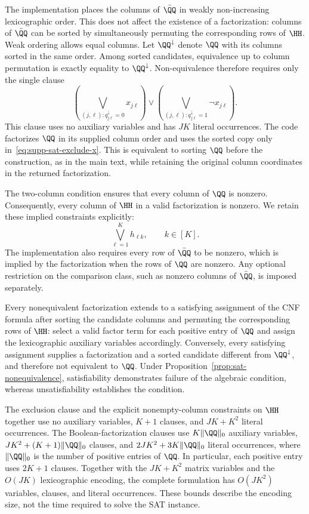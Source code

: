 The implementation places the columns of $\bar{\QQ}$ in weakly
non-increasing lexicographic order. This does not affect the existence
of a factorization: columns of $\bar{\QQ}$ can be sorted by simultaneously
permuting the corresponding rows of $\HH$. Weak ordering allows equal
columns. Let $\QQ^\downarrow$ denote $\QQ$ with its columns sorted in the
same order. Among sorted candidates, equivalence up to column permutation
is exactly equality to $\QQ^\downarrow$. Non-equivalence therefore requires
only the single clause
\begin{equation}\label{eq:supp-sat-exclude-x}
\left(\bigvee_{(j,\ell):q^\downarrow_{j\ell}=0}x_{j\ell}\right)
\vee
\left(\bigvee_{(j,\ell):q^\downarrow_{j\ell}=1}\neg x_{j\ell}\right).
\end{equation}
This clause uses no auxiliary variables and has $JK$ literal occurrences.
The code factorizes $\QQ$ in its supplied column order and uses the sorted
copy only in~\eqref{eq:supp-sat-exclude-x}. This is equivalent to sorting
$\QQ$ before the construction, as in the main text, while retaining the
original column coordinates in the returned factorization.

The two-column condition ensures that every column of $\QQ$ is nonzero.
Consequently, every column of $\HH$ in a valid factorization is nonzero.
We retain these implied constraints explicitly:
\begin{equation}\label{eq:supp-sat-h-nonempty}
\bigvee_{\ell=1}^K h_{\ell k},\qquad k\in[K].
\end{equation}
The implementation also requires every row of $\bar{\QQ}$ to be nonzero,
which is implied by the factorization when the rows of $\QQ$ are nonzero.
Any optional restriction on the comparison class, such as nonzero columns
of $\bar{\QQ}$, is imposed separately.

Every nonequivalent factorization extends to a satisfying assignment of
the CNF formula after sorting the candidate columns and permuting the
corresponding rows of $\HH$: select a valid factor term for each positive
entry of $\QQ$ and assign the lexicographic auxiliary variables accordingly.
Conversely, every satisfying assignment supplies a factorization and a
sorted candidate different from $\QQ^\downarrow$, and therefore not
equivalent to $\QQ$. Under Proposition~\ref{prop:sat-nonequivalence},
satisfiability demonstrates failure of the algebraic condition, whereas
unsatisfiability establishes the condition.

The exclusion clause and the explicit nonempty-column constraints on
$\HH$ together use no auxiliary variables, $K+1$ clauses, and $JK+K^2$
literal occurrences. The Boolean-factorization clauses use
$K\|\QQ\|_0$ auxiliary variables, $JK^2+(K+1)\|\QQ\|_0$ clauses, and
$2JK^2+3K\|\QQ\|_0$ literal occurrences, where $\|\QQ\|_0$ is the
number of positive entries of $\QQ$. In particular, each positive entry
uses $2K+1$ clauses. Together with the $JK+K^2$ matrix variables and the
$O(JK)$ lexicographic encoding, the complete formulation has $O(JK^2)$
variables, clauses, and literal occurrences. These bounds describe the
encoding size, not the time required to solve the SAT instance.

